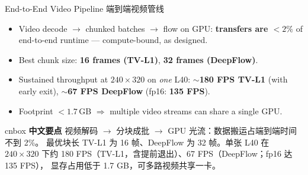 \documentclass[aspectratio=169,10pt]{beamer}
\newcommand{\zh}[1]{{\zhfont #1}}
\newenvironment{cn}{%
  \begin{beamercolorbox}[rounded=true,sep=4pt,wd=\textwidth]{cnbox}\zhfont\footnotesize
  {\color{cblue!70!black}\textbf{中文要点}}\quad}%
  {\end{beamercolorbox}}
\begin{document}
\begin{frame}{End-to-End Video Pipeline \zh{端到端视频管线}}
  \begin{itemize}\itemsep2pt
    \item Video decode $\to$ chunked batches $\to$ flow on GPU:
      \textbf{transfers are $<2\%$} of end-to-end runtime --- compute-bound,
      as designed.
    \item Best chunk size: \textbf{16 frames (TV-L1)}, \textbf{32 frames
      (DeepFlow)}.
    \item Sustained throughput at $240{\times}320$ on \emph{one} L40:
      $\sim$\textbf{180 FPS TV-L1} (with early exit),
      $\sim$\textbf{67 FPS DeepFlow} (fp16: \textbf{135 FPS}).
    \item Footprint $<1.7$\,GB $\Rightarrow$ multiple video streams can share
      a single GPU.
  \end{itemize}
  \vfill
  \begin{cn}
    视频解码 $\to$ 分块成批 $\to$ GPU 光流：数据搬运占端到端时间不到 2\%。
    最优块长 TV-L1 为 16 帧、DeepFlow 为 32 帧。单张 L40 在 $240\times320$
    下约 180 FPS（TV-L1，含提前退出）、67 FPS（DeepFlow；fp16 达 135 FPS），
    显存占用低于 1.7 GB，可多路视频共享一卡。
  \end{cn}
\end{frame}
\end{document}
